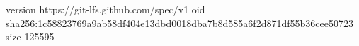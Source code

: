 version https://git-lfs.github.com/spec/v1
oid sha256:1c58823769a9ab58df404e13dbd0018dba7b8d585a6f2d871df55b36cee50723
size 125595
